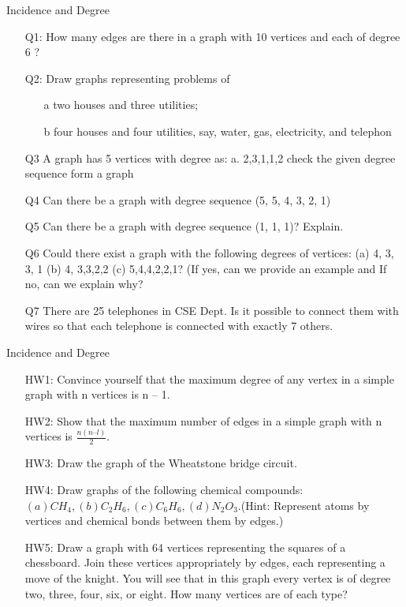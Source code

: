 \documentclass{beamer}
\begin{document}
\begin{frame}{Incidence and Degree}
	\begin{itemize}
		\item[Q1:] How many edges are there in a graph with 10 vertices and each 
		of degree 6 ? 
			\item[Q2:] Draw graphs representing problems of
			\begin{itemize}
				\item[a] two houses and three utilities;
				\item[b] four houses and four utilities, say, water, gas, electricity, and
				telephon
			\end{itemize} 
		\item[Q3] A graph has 5 vertices with degree as:
		a. 2,3,1,1,2 check the given degree sequence form a graph
		\item[Q4] Can there be a graph with degree sequence (5, 5, 4, 3, 2, 1)
		\item[Q5] Can there be a graph with degree sequence (1, 1, 1)? Explain.
		\item[Q6] Could there exist a graph with the following degrees of vertices: (a) 4, 3, 3, 1 (b) 4, 3,3,2,2 (c) 5,4,4,2,2,1? (If yes, can we provide an example and If no, can we explain why?
		\item[Q7] There are 25 telephones in CSE Dept. Is it possible to connect them with wires so that each telephone is connected with exactly 7 others. 
	\end{itemize}
\end{frame}
\begin{frame}{Incidence and Degree}
	\begin{itemize}
			\item[HW1:] Convince yourself that the maximum degree of any vertex in a simple
		graph with n vertices is n – 1.
		\item[HW2:]  Show that the maximum number of edges in a simple graph with n
		vertices is $\frac{n(n – l)}{2}$.
		\item[HW3:] Draw the graph of the Wheatstone bridge circuit.
		\item[HW4:] Draw graphs of the following chemical compounds:$ (a) CH_4, (b) C_2H_6,(c) C_6H_6,(d)N_2O_3.$(Hint: Represent atoms by vertices and chemical bonds between them by edges.)
		\item[HW5:] Draw a graph with 64 vertices representing the squares of a chessboard.
		Join these vertices appropriately by edges, each representing a move of
		the knight. You will see that in this graph every vertex is of degree two,
		three, four, six, or eight. How many vertices are of each type?
	
	\end{itemize}
\end{frame}
\end{document}
